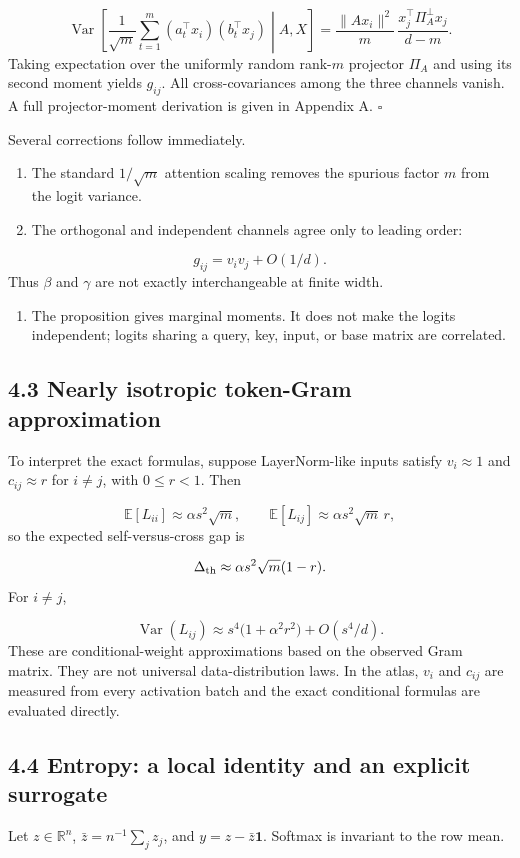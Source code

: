 \documentclass[11pt,letterpaper]{article}
\theoremstyle{definition}
\begin{document}
\[
\operatorname{Var}\!\left[
\frac{1}{\sqrt m}\sum_{t=1}^m(a_t^\top x_i)(b_t^\top x_j)
\middle|A,X\right]
=\frac{\|Ax_i\|^2}{m}\,
\frac{x_j^\top\Pi_A^\perp x_j}{d-m}.
\]
Taking expectation over the uniformly random rank-$m$ projector $\Pi_A$ and using its second moment yields $g_{ij}$. All cross-covariances among the three channels vanish. A full projector-moment derivation is given in Appendix A. $\square$

Several corrections follow immediately.

\begin{enumerate}
  \item The standard $1/\sqrt m$ attention scaling removes the spurious factor $m$ from the logit variance.
  \item The orthogonal and independent channels agree only to leading order:
\end{enumerate}
\[
g_{ij}=v_iv_j+O(1/d).
\]
Thus $\beta$ and $\gamma$ are not exactly interchangeable at finite width.

\begin{enumerate}
  \item The proposition gives marginal moments. It does not make the logits independent; logits sharing a query, key, input, or base matrix are correlated.
\end{enumerate}
\subsection{4.3 Nearly isotropic token-Gram approximation}
To interpret the exact formulas, suppose LayerNorm-like inputs satisfy $v_i\approx1$ and $c_{ij}\approx r$ for $i\ne j$, with $0\le r<1$. Then

\[
\mathbb E[L_{ii}]\approx\alpha s^2\sqrt m,\qquad
\mathbb E[L_{ij}]\approx\alpha s^2\sqrt m\,r,
\]
so the expected self-versus-cross gap is

\[
\Delta_{\rm th}
\approx \alpha s^2\sqrt m(1-r).
\]
For $i\ne j$,

\[
\operatorname{Var}(L_{ij})
\approx s^4\big(1+\alpha^2r^2\big)+O(s^4/d).
\]
These are conditional-weight approximations based on the observed Gram matrix. They are not universal data-distribution laws. In the atlas, $v_i$ and $c_{ij}$ are measured from every activation batch and the exact conditional formulas are evaluated directly.

\subsection{4.4 Entropy: a local identity and an explicit surrogate}
Let $z\in\mathbb R^n$, $\bar z=n^{-1}\sum_jz_j$, and $y=z-\bar z\mathbf1$. Softmax is invariant to the row mean.
\end{document}
